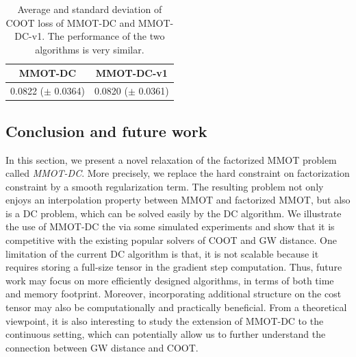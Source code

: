 \begin{table}[H]
  \label{tab:coot_new}
  \begin{center}
    \begin{small}
      \begin{sc}
        \begin{tabular}{|c|c|}
          \hline
          MMOT-DC & MMOT-DC-v1 \\
          \hline
          0.0822 ($\pm$ 0.0364) & 0.0820 ($\pm$ 0.0361) \\
          \hline
        \end{tabular}
      \end{sc}
    \end{small}
  \end{center}
  \caption{Average and standard deviation of COOT loss of MMOT-DC and MMOT-DC-v1.
  The performance of the two algorithms is very similar.}
\end{table}

\subsection{Conclusion and future work}

In this section, we present a novel relaxation of the factorized MMOT problem called \textit{MMOT-DC}.
More precisely, we replace the
hard constraint on factorization constraint by a smooth regularization term. The resulting problem
not only enjoys an interpolation property between MMOT and factorized MMOT, but also is a DC problem,
which can be solved easily by the DC algorithm. We illustrate the use of MMOT-DC the via some simulated experiments and show that
it is competitive with the existing popular solvers of COOT and GW distance.
One limitation of the current DC algorithm is that, it is not scalable because
it requires storing a full-size tensor in the gradient step computation. Thus, future
work may focus on more efficiently designed algorithms, in terms of both time and memory footprint.
Moreover, incorporating additional structure on the cost tensor may also be computationally and practically beneficial.
From a theoretical viewpoint, it is also interesting to study the extension of MMOT-DC to the continuous setting,
which can potentially allow us to further understand the connection between GW distance and COOT.


